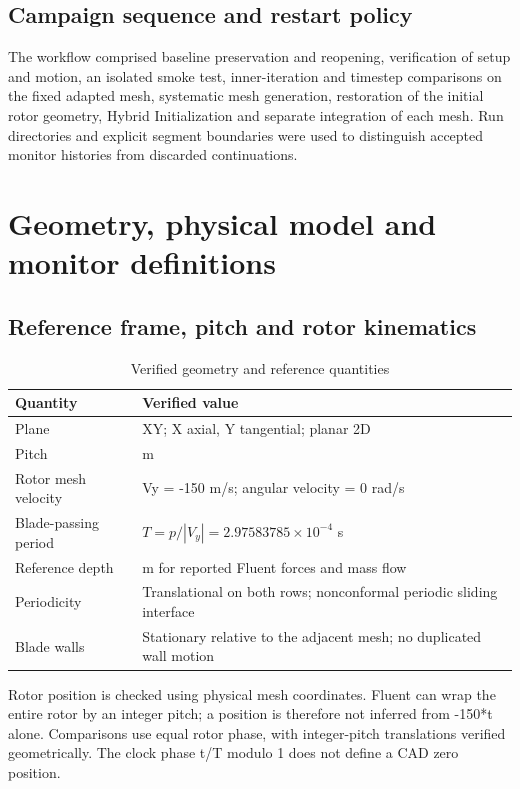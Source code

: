 \documentclass[11pt,a4paper]{article}
\begin{document}
\subsection{Campaign sequence and restart policy}
The workflow comprised baseline preservation and reopening, verification of setup and motion, an isolated smoke test, inner-iteration and timestep comparisons on the fixed adapted mesh, systematic mesh generation, restoration of the initial rotor geometry, Hybrid Initialization and separate integration of each mesh. Run directories and explicit segment boundaries were used to distinguish accepted monitor histories from discarded continuations.\par

\FloatBarrier
\section{Geometry, physical model and monitor definitions}
\subsection{Reference frame, pitch and rotor kinematics}
\par
\begin{table}[!htbp]
\centering
\caption{Verified geometry and reference quantities}
\label{tab:2}
\small\renewcommand{\arraystretch}{1.16}
\begin{tabularx}{\linewidth}{@{}>{\raggedright\arraybackslash}X >{\raggedright\arraybackslash}X@{}}
\toprule
\textbf{Quantity} & \textbf{Verified value} \\
\midrule
Plane & XY; X axial, Y tangential; planar 2D \\
Pitch & 0.04463756775 m \\
Rotor mesh velocity & Vy = -150 m/s; angular velocity = 0 rad/s \\
Blade-passing period & $T=p/|V_y|=2.97583785\times10^{-4}$ s \\
Reference depth & 1 m for reported Fluent forces and mass flow \\
Periodicity & Translational on both rows; nonconformal periodic sliding interface \\
Blade walls & Stationary relative to the adjacent mesh; no duplicated wall motion \\
\bottomrule
\end{tabularx}
\end{table}
\par
Rotor position is checked using physical mesh coordinates. Fluent can wrap the entire rotor by an integer pitch; a position is therefore not inferred from -150*t alone. Comparisons use equal rotor phase, with integer-pitch translations verified geometrically. The clock phase t/T modulo 1 does not define a CAD zero position.\par
\end{document}
